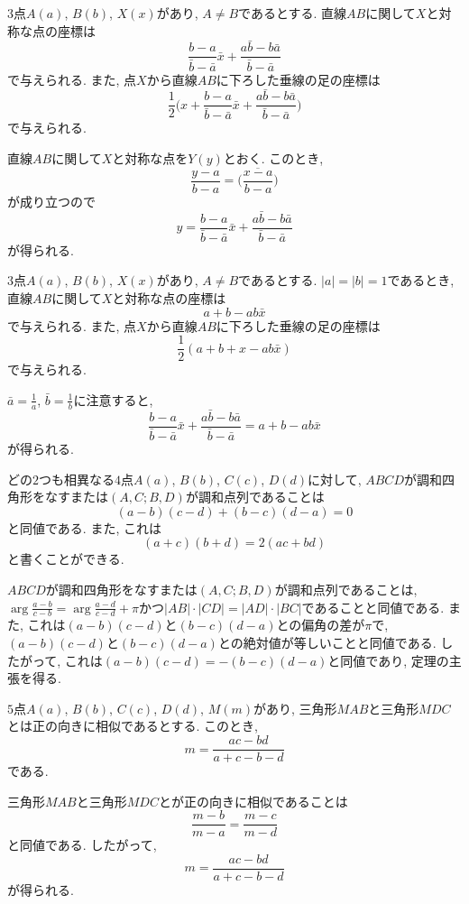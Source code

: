 %
%
\begin{bthm}
$3$点$A(a)$, $B(b)$, $X(x)$があり, $A\neq B$であるとする.
直線$AB$に関して$X$と対称な点の座標は
\[\frac{b-a}{\bar{b}-\bar{a}}\bar{x}+\frac{a\bar{b}-b\bar{a}}{\bar{b}-\bar{a}}\]
で与えられる.
また, 点$X$から直線$AB$に下ろした垂線の足の座標は
\[\frac 12\biggl(x+\frac{b-a}{\bar{b}-\bar{a}}\bar{x}+\frac{a\bar{b}-b\bar{a}}{\bar{b}-\bar{a}}\biggr)\]
で与えられる.
\end{bthm}
\begin{prf*}
直線$AB$に関して$X$と対称な点を$Y(y)$とおく.
このとき,
\[\frac{y-a}{b-a}=\overline{\biggl(\frac{x-a}{b-a}\biggr)}\]
が成り立つので
\[y=\frac{b-a}{\bar{b}-\bar{a}}\bar{x}+\frac{a\bar{b}-b\bar{a}}{\bar{b}-\bar{a}}\]
が得られる.
\end{prf*}
%
%
\begin{bcor}\label{cor:reflection2}
$3$点$A(a)$, $B(b)$, $X(x)$があり, $A\neq B$であるとする.
$\lvert a\rvert=\lvert b\rvert=1$であるとき, 直線$AB$に関して$X$と対称な点の座標は
\[a+b-ab\bar x\]
で与えられる.
また, 点$X$から直線$AB$に下ろした垂線の足の座標は
\[\frac 12(a+b+x-ab\bar x)\]
で与えられる.
\end{bcor}
\begin{prf*}
$\bar a=\frac 1a$, $\bar b=\frac 1b$に注意すると,
\[\frac{b-a}{\bar{b}-\bar{a}}\bar{x}+\frac{a\bar{b}-b\bar{a}}{\bar{b}-\bar{a}}=a+b-ab\bar x\]
が得られる.
\end{prf*}
%
%
\begin{bthm}\label{thm:harmonic}
どの$2$つも相異なる$4$点$A(a)$, $B(b)$, $C(c)$, $D(d)$に対して, $ABCD$が調和四角形をなすまたは$(A,C;B,D)$が調和点列であることは
\[
(a-b)(c-d)+(b-c)(d-a)=0
\]
と同値である.
また, これは
\[
(a+c)(b+d)=2(ac+bd)
\]
と書くことができる.
\end{bthm}
\begin{prf*}
$ABCD$が調和四角形をなすまたは$(A,C;B,D)$が調和点列であることは, $\arg\frac{a-b}{c-b}=\arg\frac{a-d}{c-d}+\pi$かつ$\lvert AB\rvert\cdot\lvert CD\rvert=\lvert AD\rvert\cdot\lvert BC\rvert$であることと同値である.
また, これは$(a-b)(c-d)$と$(b-c)(d-a)$との偏角の差が$\pi$で, $(a-b)(c-d)$と$(b-c)(d-a)$との絶対値が等しいことと同値である.
したがって, これは$(a-b)(c-d)=-(b-c)(d-a)$と同値であり, 定理の主張を得る.
\end{prf*}
%
%
\begin{bthm}\label{thm:miquel}
$5$点$A(a)$, $B(b)$, $C(c)$, $D(d)$, $M(m)$があり, 三角形$MAB$と三角形$MDC$とは正の向きに相似であるとする.
このとき,
\[m=\frac{ac-bd}{a+c-b-d}\]
である.
\end{bthm}
\begin{prf*}
三角形$MAB$と三角形$MDC$とが正の向きに相似であることは
\[\frac{m-b}{m-a}=\frac{m-c}{m-d}\]
と同値である.
したがって,
\[m=\frac{ac-bd}{a+c-b-d}\]
が得られる.
\end{prf*}